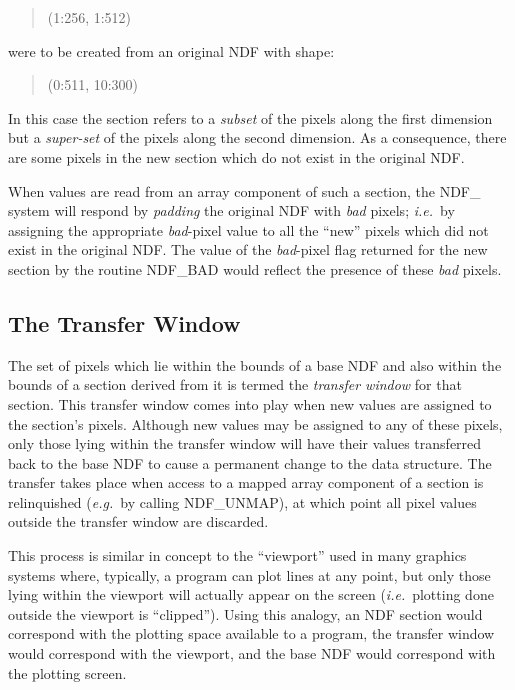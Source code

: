 \documentclass[twoside,11pt]{article}
\newcommand{\htmlref}[2]{#1}
\newcommand{\xlabel}[1]{}
\newcommand{\st}[1]{{\em{#1}}}
\begin{document}
\small
\begin{quote}
\begin{center}
(1:256, 1:512)
\end{center}
\end{quote}
\normalsize

were to be created from an original NDF with shape:

\small
\begin{quote}
\begin{center}
(0:511, 10:300)
\end{center}
\end{quote}
\normalsize

In this case the section refers to a \st{subset\/} of the pixels along the
first dimension but a \st{super-set\/} of the pixels along the second
dimension. 
As a consequence, there are some pixels in the new section which do not
exist in the original NDF. 

When values are read from an array component of such a section, the NDF\_
system will respond by \st{padding\/} the original NDF with \st{bad\/} pixels;
\st{i.e.}\ by assigning the appropriate \st{bad\/}-pixel value to all the
``new'' pixels which did not exist in the original NDF. 
The value of the \st{bad\/}-pixel flag returned for the new section by the 
routine \htmlref{NDF\_BAD}{NDF_BAD} would reflect the presence of these \st{bad\/} pixels.

\subsection{\xlabel{the_transfer_window}The Transfer Window}

The set of pixels which lie within the bounds of a base NDF and also within
the bounds of a section derived from it is termed the \st{transfer window\/}
for that section. 
This transfer window comes into play when new values are assigned to the
section's pixels. 
Although new values may be assigned to any of these pixels, only those lying
within the transfer window will have their values transferred back to the
base NDF to cause a permanent change to the data structure. 
The transfer takes place when access to a mapped array component of a
section is relinquished (\st{e.g.}\ by calling \htmlref{NDF\_UNMAP}{NDF_UNMAP}), at which point
all pixel values outside the transfer window are discarded. 

This process is similar in concept to the ``viewport'' used in many graphics
systems where, typically, a program can plot lines at any point, but only
those lying within the viewport will actually appear on the screen (\st{i.e.}\ plotting done outside the viewport is ``clipped''). 
Using this analogy, an NDF section would correspond with the plotting space
available to a program, the transfer window would correspond with the
viewport, and the base NDF would correspond with the plotting screen. 
\end{document}
